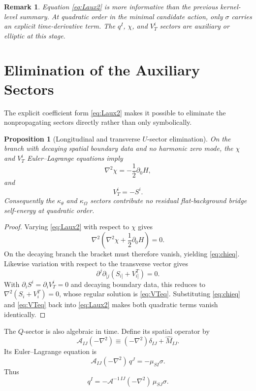 \documentclass[11pt]{article}
\newtheorem{proposition}{Proposition}
\newtheorem{remark}{Remark}
\begin{document}
\begin{remark}
Equation \eqref{eq:Laux2} is more informative than the previous kernel-level summary. At quadratic order in the minimal candidate action, only \(\sigma\) carries an explicit time-derivative term. The \(q^I\), \(\chi\), and \(V_T^i\) sectors are auxiliary or elliptic at this stage.
\end{remark}

\section{Elimination of the Auxiliary Sectors}

The explicit coefficient form \eqref{eq:Laux2} makes it possible to eliminate the nonpropagating sectors directly rather than only symbolically.

\begin{proposition}[Longitudinal and transverse \(U\)-sector elimination]
On the branch with decaying spatial boundary data and no harmonic zero mode, the \(\chi\) and \(V_T^i\) Euler--Lagrange equations imply
\begin{equation}
\nabla^2\chi=-\frac{1}{2}\partial_0H,
\label{eq:chieq}
\end{equation}
and
\begin{equation}
V_T^i=-S^i.
\label{eq:VTeq}
\end{equation}
Consequently the \(\kappa_\theta\) and \(\kappa_\Omega\) sectors contribute no residual flat-background bridge self-energy at quadratic order.
\end{proposition}

\begin{proof}
Varying \eqref{eq:Laux2} with respect to \(\chi\) gives
\[
\nabla^2\!\left(\nabla^2\chi+\frac{1}{2}\partial_0H\right)=0.
\]
On the decaying branch the bracket must therefore vanish, yielding \eqref{eq:chieq}. Likewise variation with respect to the transverse vector gives
\[
\partial^j\partial_{[j}\!\left(S_{i]}+V^T_{i]}\right)=0.
\]
With \(\partial_iS^i=\partial_iV_T^i=0\) and decaying boundary data, this reduces to \(\nabla^2(S_i+V_i^T)=0\), whose regular solution is \eqref{eq:VTeq}. Substituting \eqref{eq:chieq} and \eqref{eq:VTeq} back into \eqref{eq:Laux2} makes both quadratic terms vanish identically.
\end{proof}

The \(Q\)-sector is also algebraic in time. Define its spatial operator by
\begin{equation}
\mathcal A_{IJ}(-\nabla^2)\equiv (-\nabla^2)\delta_{IJ}+\widehat M_{IJ}.
\label{eq:Aoperator}
\end{equation}
Its Euler--Lagrange equation is
\begin{equation}
\mathcal A_{IJ}(-\nabla^2)\,q^J=-\mu_{SI}\sigma.
\label{eq:qeq}
\end{equation}
Thus
\begin{equation}
q^I=-\mathcal A^{-1\,IJ}(-\nabla^2)\,\mu_{SJ}\sigma.
\label{eq:qsolve}
\end{equation}
\end{document}
